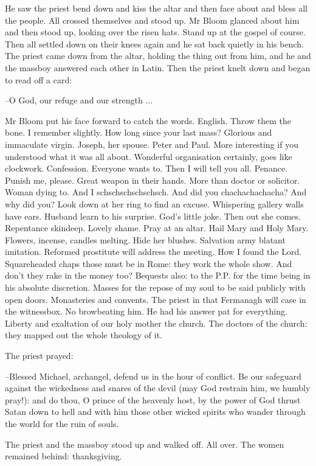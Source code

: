 He saw the priest bend down and kiss the altar
and then face about and bless all the people.
All crossed themselves and stood up.
Mr Bloom glanced about him
and then stood up,
looking over the risen hats.
Stand up at the gospel of course.
Then all settled down on their knees again
and he sat back quietly in his bench.
The priest came down from the altar,
holding the thing out from him,
and he and the massboy answered each other in Latin.
Then the priest knelt down and began to read off a card:

--O God, our refuge and our strength ...

Mr Bloom put his face forward to catch the words.
English.
Throw them the bone.
I remember slightly.
How long since your last mass?
Glorious and immaculate virgin.
Joseph, her spouse.
Peter and Paul.
More interesting if you understood what it was all about.
Wonderful organisation certainly,
goes like clockwork.
Confession.
Everyone wants to.
Then I will tell you all.
Penance.
Punish me, please.
Great weapon in their hands.
More than doctor or solicitor.
Woman dying to.
And I schschschschschsch.
And did you chachachachacha?
And why did you?
Look down at her ring to find an excuse.
Whispering gallery walls have ears.
Husband learn to his surprise.
God's little joke.
Then out she comes.
Repentance skindeep.
Lovely shame.
Pray at an altar.
Hail Mary and Holy Mary.
Flowers, incense, candles melting.
Hide her blushes.
Salvation army blatant imitation.
Reformed prostitute will address the meeting.
How I found the Lord.
Squareheaded chaps those must be in Rome:
they work the whole show.
And don't they rake in the money too?
Bequests also:
to the P.P. for the time being in his absolute discretion.
Masses for the repose of my soul to be said publicly with open doors.
Monasteries and convents.
The priest in that Fermanagh will case in the witnessbox.
No browbeating him.
He had his answer pat for everything.
Liberty and exaltation of our holy mother the church.
The doctors of the church:
they mapped out the whole theology of it.

The priest prayed:

--Blessed Michael,
archangel,
defend us in the hour of conflict.
Be our safeguard against the wickedness and snares of the devil
(may God restrain him, we humbly pray!):
and do thou,
O prince of the heavenly host,
by the power of God
thrust Satan down to hell and with him
those other wicked spirits who wander through the world
for the ruin of souls.

The priest and the massboy stood up and walked off.
All over.
The women remained behind:
thanksgiving.

